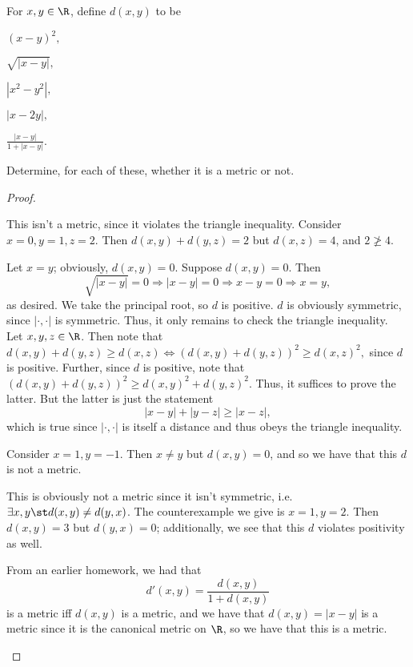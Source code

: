 \documentclass{assignment}
\begin{document}
\begin{question}[2.11]
For $x,y\in\R$, define $d(x,y)$ to be
\begin{qparts}
  \item $(x-y)^2,$ \\
  \item $\sqrt{|x - y|},$ \\
  \item $|x^2 - y^2|,$ \\
  \item $|x - 2y|,$ \\
  \item $\frac{|x-y|}{1 + |x - y|}.$ \\
\end{qparts}
Determine, for each of these, whether it is a metric or not.
\end{question}
\begin{proof}\leavevmode
  \begin{qparts}
  \item This isn't a metric, since it violates the triangle inequality. Consider $x=0, y=1, z=2$. 
    Then $d(x,y) + d(y,z) = 2$ but $d(x,z) = 4$, and $2 \not\geq 4$.

  \item Let $x=y$; obviously, $d(x,y) = 0$. Suppose $d(x,y) = 0$. Then $$\sqrt{|x-y|} = 0 \Rightarrow
    |x - y| = 0 \Rightarrow x -y = 0 \Rightarrow x = y,$$ as desired. We take the principal root, so
    $d$ is positive. $d$ is obviously symmetric, since $|\cdot, \cdot|$ is symmetric. Thus, it only
    remains to check the triangle inequality.\\

    Let $x,y,z\in\R$. Then note that $d(x,y) + d(y,z) \geq d(x,z) \iff (d(x,y) + d(y,z))^2 \geq d(x,z)^2,$ 
    since $d$ is positive. Further, since $d$ is positive, note that $(d(x,y) + d(y,z))^2 \geq 
    d(x,y)^2 + d(y,z)^2$. Thus, it suffices to prove the latter. But the latter is just the statement
    $$|x - y| + |y - z| \geq |x - z|, $$ which is true since $|\cdot, \cdot|$ is itself a distance 
    and thus obeys the triangle inequality.

    \item Consider $x = 1, y=-1$. Then $x\neq y$ but $d(x,y) = 0$, and so we have that this $d$ is
not a metric.

    \item This is obviously not a metric since it isn't symmetric, i.e. $\exists x,y \st d(x,y) \neq 
d(y,x)$. The counterexample we give is $x = 1, y = 2$. Then $d(x,y) = 3$ but $d(y,x) = 0$;
additionally, we see that this $d$ violates positivity as well.

    \item From an earlier homework, we had that $$d'(x,y) = \frac{d(x,y)}{1 + d(x,y)}$$ is a metric
iff $d(x, y)$ is a metric, and we have that $d(x,y) = |x-y|$ is a metric since it is the canonical
metric on $\R$, so we have that this is a metric.  
  \end{qparts}
\end{proof}
\end{document}
